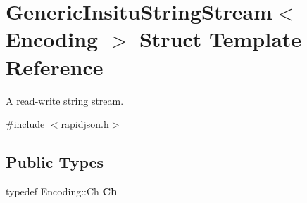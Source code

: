 \hypertarget{struct_generic_insitu_string_stream}{}\section{Generic\+Insitu\+String\+Stream$<$ Encoding $>$ Struct Template Reference}
\label{struct_generic_insitu_string_stream}


A read-\/write string stream.  




{\ttfamily \#include $<$rapidjson.\+h$>$}

\subsection*{Public Types}
\begin{DoxyCompactItemize}
\item 
\hypertarget{struct_generic_insitu_string_stream_a277308a58f551f11d0d9a20823702b5a}{}typedef Encoding\+::\+Ch {\bfseries Ch}\label{struct_generic_insitu_string_stream_a277308a58f551f11d0d9a20823702b5a}

\end{DoxyCompactItemize}
